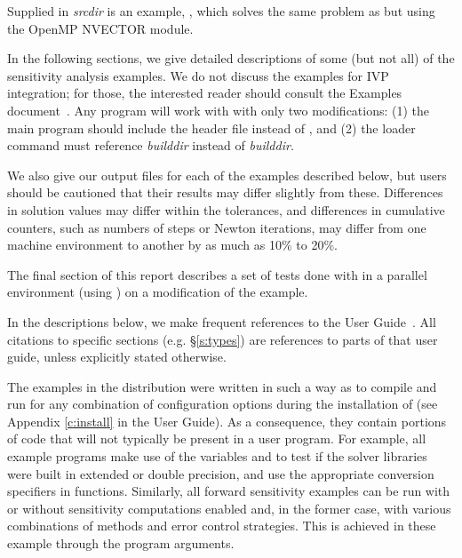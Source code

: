 
\vspace{0.2in}\noindent 
Supplied in {\em srcdir} is
an example, , which solves the same problem as
 but using the OpenMP NVECTOR module.


\vspace{0.2in}\noindent
In the following sections, we give detailed descriptions of some (but
not all) of the sensitivity analysis examples. We do not discuss the 
examples for IVP integration; for those, the interested reader should consult
the {\cvode} Examples document~\cite{cvode_ex}. Any {\cvode} program
will work with {\cvodes} with only two modifications: (1) the main program
should include the header file  instead of , and
(2) the loader command must reference
{\em builddir} instead of
{\em builddir}.

We also give our output files for each of the examples described below, 
but users should be cautioned that their
results may differ slightly from these.  Differences in solution
values may differ within the tolerances, and differences in cumulative
counters, such as numbers of steps or Newton iterations, may differ
from one machine environment to another by as much as 10\% to 20\%.

The final section of this report describes a set of tests done with
{\cvodes} in a parallel environment (using {\nvecp}) on a modification of
the  example.

In the descriptions below, we make frequent references to the {\cvodes}
User Guide~\cite{cvodes_ug}.  All citations to specific sections
(e.g. \S\ref{s:types}) are references to parts of that user guide, unless
explicitly stated otherwise.

\vspace{0.2in}
The examples in the {\cvodes} distribution were written in such a way as
to compile and run for any combination of configuration options during
the installation of {\sundials} (see Appendix \ref{c:install} in the User Guide).
As a consequence, they contain portions of code that will not typically be present in a
user program. For example, all example programs make use of the
variables  and 
to test if the solver libraries
were built in extended or double precision, and use the appropriate conversion 
specifiers in  functions. Similarly, all forward sensitivity
examples can be run with or without sensitivity computations enabled and,
in the former case, with various combinations of methods and error control 
strategies. This is achieved in these example through the program arguments.

